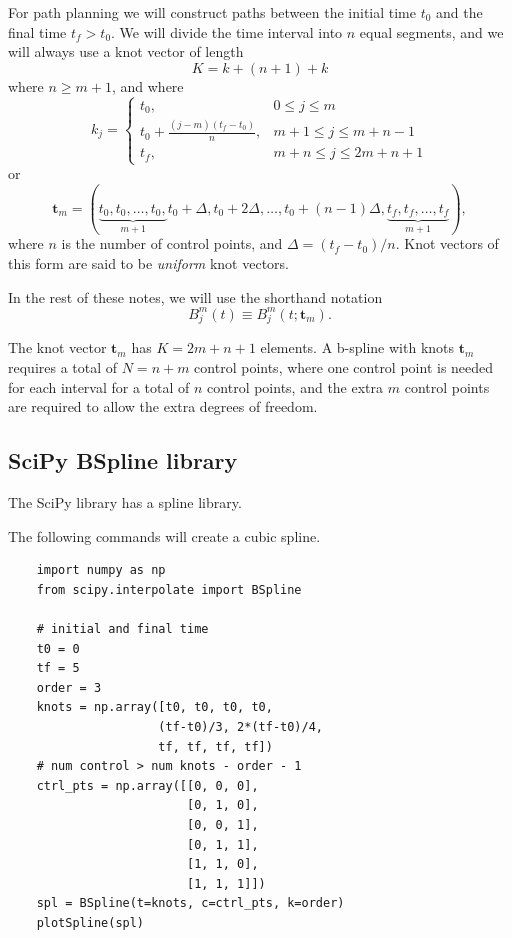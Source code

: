 \documentclass{article}
\begin{document}
For path planning we will construct paths between the initial time $t_0$ and the final time $t_f>t_0$.  We will divide the time interval into $n$ equal segments, and we will always use a knot vector of length 
\[
K=k+(n+1)+k
\]
where $n\geq m+1$, and where
\[
		k_j = \begin{cases}
 				t_0, & 0\leq j \leq m \\
 				t_0 + \frac{(j-m)(t_f-t_0)}{n}, & m+1 \leq j \leq m+n-1 \\
 				t_f, & m+n \leq j \leq 2m + n + 1
 			  \end{cases}
\]
or 
\[
\mathbf{t}_m = (\underbrace{t_0, t_0, \dots, t_0,}_{m+1} t_0+\Delta, t_0+2\Delta, \dots, t_0+(n-1)\Delta, \underbrace{t_f, t_f, \dots, t_f}_{m+1}),
\]
where $n$ is the number of control points, and $\Delta = (t_f-t_0)/n$.  Knot vectors of this form are said to be {\em uniform} knot vectors.

In the rest of these notes, we will use the shorthand notation
\[
B_j^m(t)\equiv B_j^m(t; \mathbf{t}_m).
\]

The knot vector $\mathbf{t}_m$ has $K=2m+n+1$ elements.  A b-spline with knots $\mathbf{t}_m$ requires a total of $N=n+m$ control points, where one control point is needed for each interval for a total of $n$ control points, and the extra $m$ control points are required to allow the extra degrees of freedom.

\subsection{SciPy BSpline library}
The SciPy library has a spline library.  

The following commands will create a cubic spline.
\begin{lstlisting}
	import numpy as np
	from scipy.interpolate import BSpline

    # initial and final time
    t0 = 0
    tf = 5
    order = 3
    knots = np.array([t0, t0, t0, t0,
                     (tf-t0)/3, 2*(tf-t0)/4,
                     tf, tf, tf, tf])
    # num control > num knots - order - 1
    ctrl_pts = np.array([[0, 0, 0],  
                         [0, 1, 0],
                         [0, 0, 1],
                         [0, 1, 1],
                         [1, 1, 0],
                         [1, 1, 1]])
    spl = BSpline(t=knots, c=ctrl_pts, k=order)
    plotSpline(spl)
\end{lstlisting}
\end{document}
